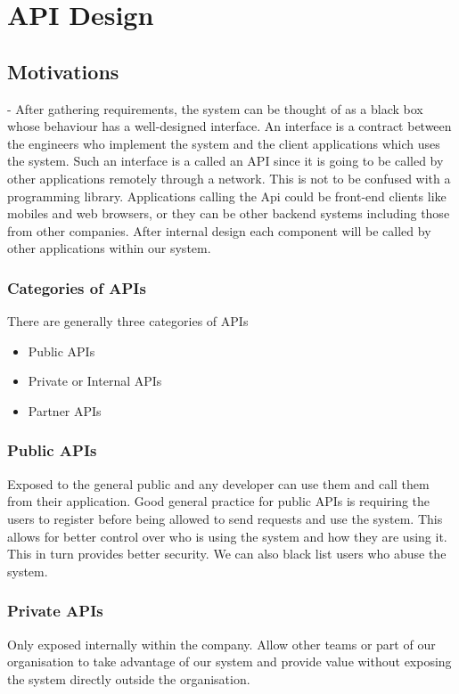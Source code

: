 \chapter{API Design}


\section{Motivations} - After gathering requirements, the system can be thought of as a black box whose behaviour has a well-designed interface.
An interface is a contract between the engineers who implement the system and the client applications which uses the system.
Such an interface is a called an API since it is going to be called by other applications remotely through a network.
This is not to be confused with a programming library.
Applications calling the Api could be front-end clients like mobiles and web browsers, or they can be other backend systems including those from other companies.
After internal design each component will be called by other applications within our system.

\subsection{Categories of APIs}

There are generally three categories of APIs

\begin{itemize}
    \item Public APIs
    \item Private or Internal APIs
    \item Partner APIs
\end{itemize}

\subsection{Public APIs}
Exposed to the general public and any developer can use them and call them from their application.
Good general practice for public APIs is requiring the users to register before being allowed to send requests and use the system.
This allows for better control over who is using the system and how they are using it.
This in turn provides better security.
We can also black list users who abuse the system.

\subsection{Private APIs}
Only exposed internally within the company.
Allow other teams or part of our organisation to take advantage of our system and provide value without exposing the system directly outside the organisation.

